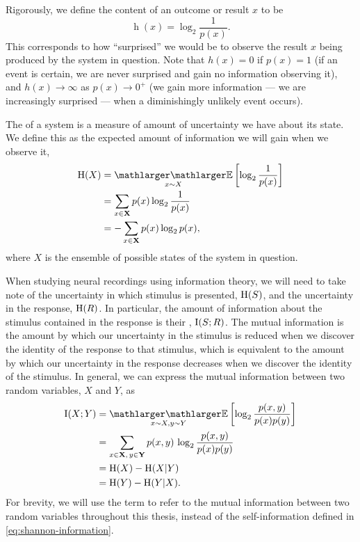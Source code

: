 Rigorously, we define the  content of an outcome or result $x$ to be
\begin{equation}
\label{eq:shannon-information}
\operatorname{h}(x) = \log_2 \frac{1}{p(x)}
.\end{equation}
This corresponds to how ``surprised'' we would be to observe the result $x$ being produced by the system in question.
Note that $h(x)=0$ if $p(x)=1$ (if an event is certain, we are never surprised and gain no information observing it), and $h(x) \to \infty$ as $p(x) \to 0^+$ (we gain more information --- we are increasingly surprised --- when a diminishingly unlikely event occurs).

The  of a system is a measure of amount of uncertainty we have about its state.
We define this as the expected amount of information we will gain when we observe it,
\begin{align}
\HH( X )
  &= \EE_{x\sim X} \left[ \log_2 \frac{1}{p(x)} \right] \notag
\\&= \sum_{x \in \SET{X}} p(x) \log_2 \frac{1}{p(x)} \notag
\\&= - \sum_{x \in \SET{X}} p(x) \log_2 p(x)
,\end{align}
where $X$ is the ensemble of possible states of the system in question.

When studying neural recordings using information theory, we will need to take note of the uncertainty in which stimulus is presented, $\operatorname{H}(S)$, and the uncertainty in the response, $\operatorname{H}(R)$.
In particular, the amount of information about the stimulus contained in the response is their , $\operatorname{I}(S;R)$.
The mutual information is the amount by which our uncertainty in the stimulus is reduced when we discover the identity of the response to that stimulus, which is equivalent to the amount by which our uncertainty in the response decreases when we discover the identity of the stimulus.
In general, we can express the mutual information between two random variables, $X$ and $Y$, as
\begin{align}
\I(X;Y)
  &= \EE_{x\sim X, y\sim Y} \left[ \log_2 \frac{p(x,y)}{p(x)p(y)} \right] \notag
\\&= \sum_{x \in \SET{X}, \, y \in \SET{Y}} p(x,y) \, \log_2 \frac{p(x,y)}{p(x)p(y)} \notag
\\&= \HH(X) - \HH(X | Y) \notag
\\&= \HH(Y) - \HH(Y | X) \label{eq:info}
.\end{align}
For brevity, we will use the term  to refer to the mutual information between two random variables throughout this thesis, instead of the self-information defined in \autoref{eq:shannon-information}.

